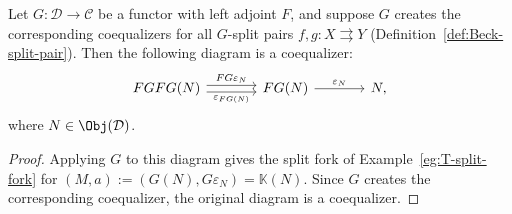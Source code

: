 \begin{lemma}\label{prop:Beck-FG-coeq}
	Let $G:\mathcal{D}\to\mathcal{C}$ be a functor with left adjoint $F$, and
	suppose $G$ creates the corresponding coequalizers for all $G$-split pairs
	$f,g:X\rightrightarrows Y$ (Definition~\ref{def:Beck-split-pair}). Then the
	following diagram is a coequalizer:
	\begin{equation*}\begin{tikzcd}[column sep=large]
		FGFG(N) \arrow[shift left, r, "FG\varepsilon_N"] \arrow[shift right, r, "\varepsilon_{FG(N)}"'] & FG(N) \arrow[r, "\varepsilon_N"] & N,
	\end{tikzcd}\end{equation*}
	where $N\in\Obj(\mathcal{D})$.
\end{lemma}
\begin{proof}
	Applying $G$ to this diagram gives the split fork of
	Example~\ref{eg:T-split-fork} for
	$(M,a):=(G(N),G\varepsilon_N)=\mathbb{K}(N)$. Since $G$ creates the
	corresponding coequalizer, the original diagram is a coequalizer.
\end{proof}

